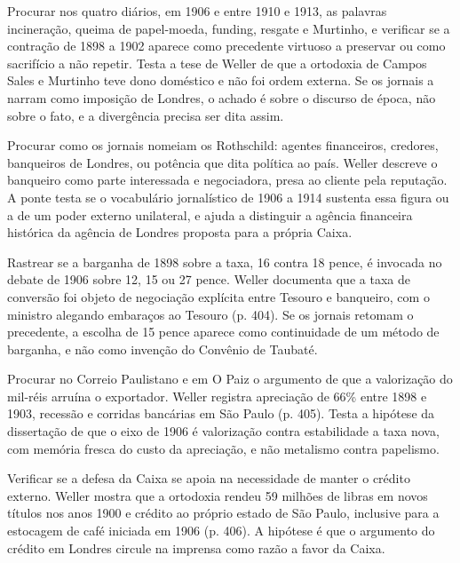 \begin{dialogo}
\item Procurar nos quatro diários, em 1906 e entre 1910 e 1913, as palavras
incineração, queima de papel-moeda, funding, resgate e Murtinho, e verificar se
a contração de 1898 a 1902 aparece como precedente virtuoso a preservar ou como
sacrifício a não repetir. Testa a tese de Weller de que a ortodoxia de Campos
Sales e Murtinho teve dono doméstico e não foi ordem externa. Se os jornais a
narram como imposição de Londres, o achado é sobre o discurso de época, não
sobre o fato, e a divergência precisa ser dita assim.
\item Procurar como os jornais nomeiam os Rothschild: agentes financeiros,
credores, banqueiros de Londres, ou potência que dita política ao país. Weller
descreve o banqueiro como parte interessada e negociadora, presa ao cliente pela
reputação. A ponte testa se o vocabulário jornalístico de 1906 a 1914 sustenta
essa figura ou a de um poder externo unilateral, e ajuda a distinguir a agência
financeira histórica da agência de Londres proposta para a própria Caixa.
\item Rastrear se a barganha de 1898 sobre a taxa, 16 contra 18 pence, é
invocada no debate de 1906 sobre 12, 15 ou 27 pence. Weller documenta que a taxa
de conversão foi objeto de negociação explícita entre Tesouro e banqueiro, com o
ministro alegando embaraços ao Tesouro (p. 404). Se os jornais retomam o
precedente, a escolha de 15 pence aparece como continuidade de um método de
barganha, e não como invenção do Convênio de Taubaté.
\item Procurar no Correio Paulistano e em O Paiz o argumento de que a
valorização do mil-réis arruína o exportador. Weller registra apreciação de
66\% entre 1898 e 1903, recessão e corridas bancárias em São Paulo (p. 405).
Testa a hipótese da dissertação de que o eixo de 1906 é valorização contra
estabilidade a taxa nova, com memória fresca do custo da apreciação, e não
metalismo contra papelismo.
\item Verificar se a defesa da Caixa se apoia na necessidade de manter o crédito
externo. Weller mostra que a ortodoxia rendeu 59 milhões de libras em novos
títulos nos anos 1900 e crédito ao próprio estado de São Paulo, inclusive para a
estocagem de café iniciada em 1906 (p. 406). A hipótese é que o argumento do
crédito em Londres circule na imprensa como razão a favor da Caixa.
\end{dialogo}

